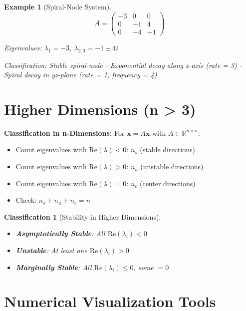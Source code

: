 \documentclass[12pt]{article}
\newtheorem{classification}{Classification}
\newtheorem{example}{Example}
\begin{document}
\begin{example}[Spiral-Node System]
$$A = \begin{pmatrix} -3 & 0 & 0 \\ 0 & -1 & 4 \\ 0 & -4 & -1 \end{pmatrix}$$

Eigenvalues: $\lambda_{1} = -3$, $\lambda_{2,3} = -1 \pm 4i$

Classification: Stable spiral-node
- Exponential decay along x-axis (rate = 3)
- Spiral decay in yz-plane (rate = 1, frequency = 4)
\end{example}

\section{Higher Dimensions (n > 3)}

\begin{keypoint}
\textbf{Classification in n-Dimensions:}
For $\dot{\mathbf{x}} = A\mathbf{x}$ with $A \in \mathbb{R}^{n \times n}$:
\begin{itemize}
    \item Count eigenvalues with $\text{Re}(\lambda) < 0$: $n_{s}$ (stable directions)
    \item Count eigenvalues with $\text{Re}(\lambda) > 0$: $n_{u}$ (unstable directions)
    \item Count eigenvalues with $\text{Re}(\lambda) = 0$: $n_{c}$ (center directions)
    \item Check: $n_{s} + n_{u} + n_{c} = n$
\end{itemize}
\end{keypoint}

\begin{classification}[Stability in Higher Dimensions]
\begin{itemize}
    \item \textbf{Asymptotically Stable}: All $\text{Re}(\lambda_{i}) < 0$
    \item \textbf{Unstable}: At least one $\text{Re}(\lambda_{i}) > 0$
    \item \textbf{Marginally Stable}: All $\text{Re}(\lambda_{i}) \leq 0$, some $= 0$
\end{itemize}
\end{classification}

\section{Numerical Visualization Tools}
\end{document}
